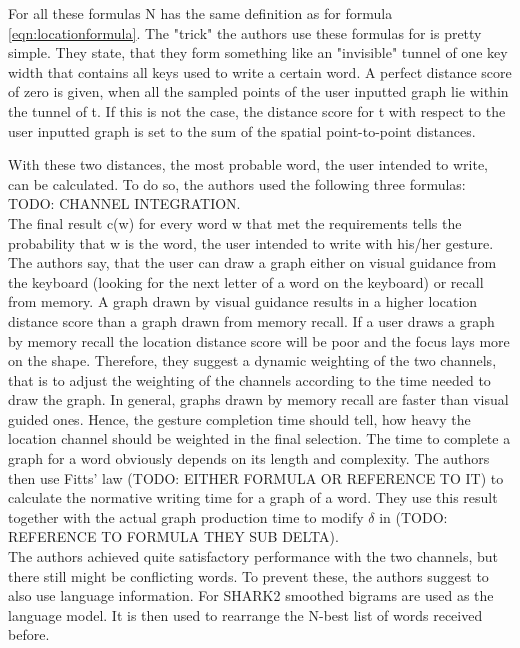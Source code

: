 For all these formulas N has the same definition as for formula \ref{eqn:locationformula}. The "trick" the authors use these formulas for is pretty simple. They state, that they form something like an "invisible" tunnel of one key width that contains all keys used to write a certain word. A perfect distance score of zero is given, when all the sampled points of the user inputted graph lie within the tunnel of t. If this is not the case, the distance score for t with respect to the user inputted graph is set to the sum of the spatial point-to-point distances.

With these two distances, the most probable word, the user intended to write, can be calculated. To do so, the authors used the following three formulas: TODO: CHANNEL INTEGRATION.\\

The final result c(w) for every word w that met the requirements tells the probability that w is the word, the user intended to write with his/her gesture.\\
The authors say, that the user can draw a graph either on visual guidance from the keyboard (looking for the next letter of a word on the keyboard) or recall from memory. A graph drawn by visual guidance results in a higher location distance score than a graph drawn from memory recall. If a user draws a graph by memory recall the location distance score will be poor and the focus lays more on the shape. Therefore, they suggest a dynamic weighting of the two channels, that is to adjust the weighting of the channels according to the time needed to draw the graph. In general, graphs drawn by memory recall are faster than visual guided ones. Hence, the gesture completion time should tell, how heavy the location channel should be weighted in the final selection. The time to complete a graph for a word obviously depends on its length and complexity. The authors then use Fitts' law (TODO: EITHER FORMULA OR REFERENCE TO IT) to calculate the normative writing time for a graph of a word. They use this result together with the actual graph production time to modify $\delta$ in (TODO: REFERENCE TO FORMULA THEY SUB DELTA).\\
The authors achieved quite satisfactory performance with the two channels, but there still might be conflicting words. To prevent these, the authors suggest to also use language information. For SHARK2 smoothed bigrams are used as the language model. It is then used to rearrange the N-best list of words received before.